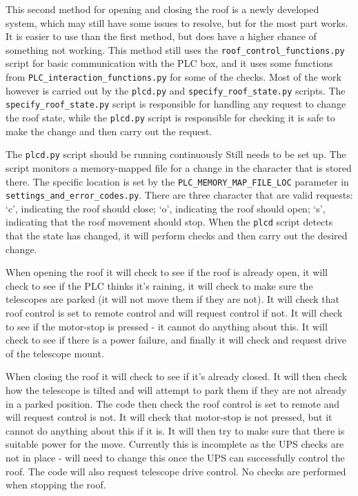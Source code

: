 \documentclass[a4paper,12pt]{article}
\begin{document}
This second method for opening and closing the roof is a newly developed system, which may still have some issues to resolve, but for the most part works. It is easier to use than the first method, but does have a higher chance of something not working. This method still uses the {\tt roof\_control\_functions.py} script for basic communication with the PLC box, and it uses some functions from {\tt PLC\_interaction\_functions.py} for some of the checks. Most of the work however is carried out by the {\tt plcd.py} and {\tt specify\_roof\_state.py} scripts.  The {\tt specify\_roof\_state.py} script is responsible for handling any request to change the roof state, while the {\tt plcd.py} script is responsible for checking it is safe to make the change and then carry out the request.

The {\tt plcd.py} script should be running continuously {\color{blue} Still needs to be set up}. The script monitors a memory-mapped file for a change in the character that is stored there. The specific location is set by the {\tt PLC\_MEMORY\_MAP\_FILE\_LOC} parameter in {\tt settings\_and\_error\_codes.py}. There are three character that are valid requests: `c', indicating the roof should close; `o', indicating the roof should open; `s', indicating that the roof movement should stop. When the {\tt plcd} script detects that the state has changed, it will perform checks and then carry out the desired change.

When opening the roof it will check to see if the roof is already open, it will check to see if the PLC thinks it's raining, it will check to make sure the telescopes are parked (it will not move them if they are not). It will check that roof control is set to remote control and will request control if not. It will check to see if the motor-stop is pressed - it cannot do anything about this. It will check to see if there is a power failure, and finally it will check and request drive of the telescope mount.

When closing the roof it will check to see if it's already closed. It will then check how the telescope is tilted and will attempt to park them if they are not already in a parked position. The code then check the roof control is set to remote and will request control is not. It will check that motor-stop is not pressed, but it cannot do anything about this if it is. It will then try to make sure that there is suitable power for the move. {\color{blue} Currently this is incomplete as the UPS checks are not in place - will need to change this once the UPS can successfully control the roof.} The code will also request telescope drive control. No checks are performed when stopping the roof.
\end{document}
